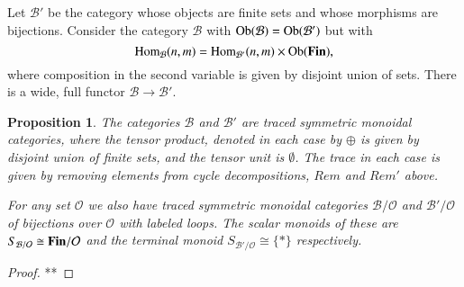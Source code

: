 \documentclass{amsart}
\def\tn{\textnormal}
\def\mc{\mathcal}
\def\Hom{\tn{Hom}}
\def\Ob{\tn{Ob}}
\def\singleton{{\{*\}}}
\def\to{\rightarrow}
\def\iso{\cong}
\def\mcB{\mc{B}}
\def\mcO{\mc{O}}
\def\Fin{{\bf Fin}}
\newtheorem{proposition}[subsection]{Proposition}
\theoremstyle{remark}
\theoremstyle{definition}
\begin{document}
Let $\mcB'$ be the category whose objects are finite sets and whose morphisms are bijections. Consider the category $\mcB$ with $\Ob(\mcB)=\Ob(\mcB')$ but with 
$$\Hom_{\mcB}(n,m)=\Hom_{\mcB'}(n,m)\times\Ob(\Fin),$$
where composition in the second variable is given by disjoint union of sets. There is a wide, full functor $\mcB\to\mcB'$.

\begin{proposition}

The categories $\mcB$ and $\mcB'$ are traced symmetric monoidal categories, where the tensor product, denoted in each case by $\oplus$ is given by disjoint union of finite sets, and the tensor unit is $\emptyset$. The trace in each case is given by removing elements from cycle decompositions, $Rem$ and $Rem'$ above.

For any set $\mcO$ we also have traced symmetric monoidal categories $\mcB/\mcO$ and $\mcB'/\mcO$ of bijections over $\mcO$ with labeled loops. The scalar monoids of these are $S_{\mcB/\mcO}\iso\Fin/\mcO$ and the terminal monoid $S_{\mcB'/\mcO}\iso\singleton$ respectively. 

\end{proposition}

\begin{proof}

**

\end{proof}
\end{document}
